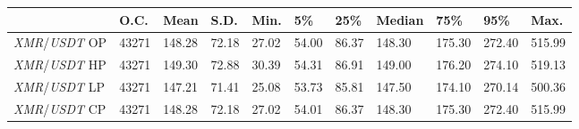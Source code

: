 \begin{tabular}{lllllllllll}
\toprule
 & \textbf{O.C.} & \textbf{Mean} & \textbf{S.D.} & \textbf{Min.} & \textbf{5\%} & \textbf{25\%} & \textbf{Median} & \textbf{75\%} & \textbf{95\%} & \textbf{Max.} \\
\midrule
\emph{XMR}/\emph{USDT} OP & 43271 & 148.28 & 72.18 & 27.02 & 54.00 & 86.37 & 148.30 & 175.30 & 272.40 & 515.99 \\
\emph{XMR}/\emph{USDT} HP & 43271 & 149.30 & 72.88 & 30.39 & 54.31 & 86.91 & 149.00 & 176.20 & 274.10 & 519.13 \\
\emph{XMR}/\emph{USDT} LP & 43271 & 147.21 & 71.41 & 25.08 & 53.73 & 85.81 & 147.50 & 174.10 & 270.14 & 500.36 \\
\emph{XMR}/\emph{USDT} CP & 43271 & 148.28 & 72.18 & 27.02 & 54.01 & 86.37 & 148.30 & 175.30 & 272.40 & 515.99 \\
\bottomrule
\end{tabular}
